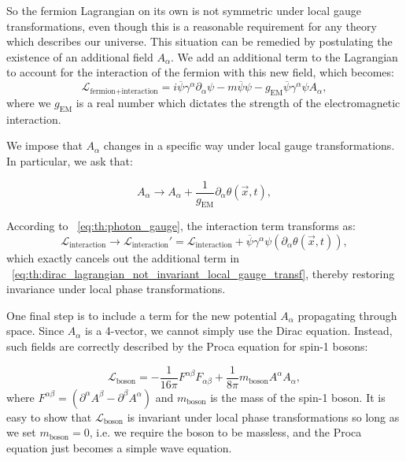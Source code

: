 So the fermion Lagrangian on its own is not symmetric under local gauge transformations, even though this is a reasonable requirement for any theory which describes our universe. This situation can be remedied by postulating the existence of an additional field $A_\alpha$. We add an additional term to the Lagrangian to account for the interaction of the fermion with this new field, which becomes:
$$
\mathcal{L}_{\textrm{fermion+interaction}} = i\overline{\psi} \gamma^{\alpha} \partial_{\alpha} \psi - m\overline{\psi}\psi  - g_{\textrm{EM}}\overline{\psi}\gamma^{\alpha}\psi A_{\alpha},
$$
where we $g_{\textrm{EM}}$ is a real number which dictates the strength of the electromagnetic interaction.

We impose that $A_\alpha$ changes in a specific way under local gauge transformations. In particular, we ask that:

\begin{equation}
\label{eq:th:photon_gauge}
A_{\alpha} \rightarrow A_{\alpha} + \frac{1}{g_{\textrm{EM}}} \partial_{\alpha} \theta(\vec{x},t),
\end{equation}

According to \Eq~\ref{eq:th:photon_gauge}, the interaction term transforms as:
$$
\mathcal{L}_{\textrm{interaction}} \rightarrow  \mathcal{L}_{\textrm{interaction}}' =  \mathcal{L}_{\textrm{interaction}}  + \overline{\psi} \gamma^{\alpha} \psi (\partial_{\alpha} \theta(\vec{x},t)),
$$
which exactly cancels out the additional term in \Eq~\ref{eq:th:dirac_lagrangian_not_invariant_local_gauge_transf}, thereby restoring invariance under local phase transformations.

One final step is to include a term for the new potential $A_{\alpha}$ propagating through space. Since  $A_{\alpha}$ is a 4-vector, we cannot simply use the Dirac equation. Instead, such fields are correctly described by the Proca equation for spin-1 bosons:

\begin{equation}
\label{eq:th:proca}
\mathcal{L}_{\textrm{boson}} = -\frac{1}{16\pi} F^{\alpha\beta}F_{\alpha\beta} + \frac{1}{8\pi} m_{\textrm{boson}} A^{\alpha} A_{\alpha},
\end{equation}
where $F^{\alpha \beta} =(\partial^{\alpha} A^{\beta} - \partial^{\beta} A^{\alpha})$ and $m_{\textrm{boson}}$ is the mass of the spin-1 boson. 
It is easy to show that $\mathcal{L}_{\textrm{boson}}$ is invariant under local phase transformations so long as we set $m_{\textrm{boson}}=0$, i.e. we require the boson to be massless, and the Proca equation just becomes a simple wave equation.

